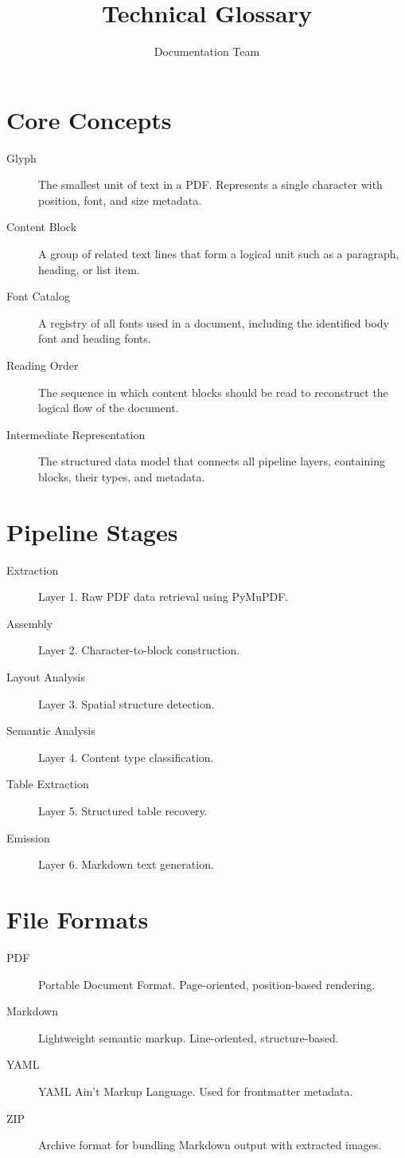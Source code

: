\documentclass[12pt]{article}
\title{Technical Glossary}
\author{Documentation Team}
\begin{document}
\maketitle

\section{Core Concepts}

\begin{description}
\item[Glyph] The smallest unit of text in a PDF. Represents a single character
with position, font, and size metadata.

\item[Content Block] A group of related text lines that form a logical unit such
as a paragraph, heading, or list item.

\item[Font Catalog] A registry of all fonts used in a document, including the
identified body font and heading fonts.

\item[Reading Order] The sequence in which content blocks should be read to
reconstruct the logical flow of the document.

\item[Intermediate Representation] The structured data model that connects all
pipeline layers, containing blocks, their types, and metadata.
\end{description}

\section{Pipeline Stages}

\begin{description}
\item[Extraction] Layer 1. Raw PDF data retrieval using PyMuPDF.
\item[Assembly] Layer 2. Character-to-block construction.
\item[Layout Analysis] Layer 3. Spatial structure detection.
\item[Semantic Analysis] Layer 4. Content type classification.
\item[Table Extraction] Layer 5. Structured table recovery.
\item[Emission] Layer 6. Markdown text generation.
\end{description}

\section{File Formats}

\begin{description}
\item[PDF] Portable Document Format. Page-oriented, position-based rendering.
\item[Markdown] Lightweight semantic markup. Line-oriented, structure-based.
\item[YAML] YAML Ain't Markup Language. Used for frontmatter metadata.
\item[ZIP] Archive format for bundling Markdown output with extracted images.
\end{description}
\end{document}

